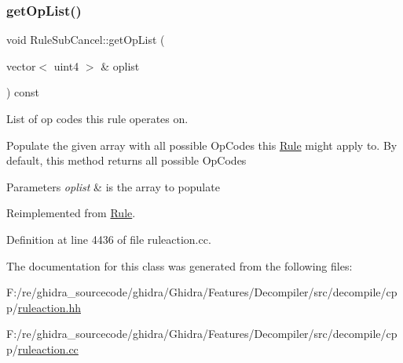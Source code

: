 \subsubsection{\texorpdfstring{getOpList()}{getOpList()}}
{\footnotesize\ttfamily void Rule\+Sub\+Cancel\+::get\+Op\+List (\begin{DoxyParamCaption}\item[{vector$<$ uint4 $>$ \&}]{oplist }\end{DoxyParamCaption}) const\hspace{0.3cm}{\ttfamily [virtual]}}



List of op codes this rule operates on. 

Populate the given array with all possible Op\+Codes this \mbox{\hyperlink{class_rule}{Rule}} might apply to. By default, this method returns all possible Op\+Codes 
\begin{DoxyParams}{Parameters}
{\em oplist} & is the array to populate \\
\hline
\end{DoxyParams}


Reimplemented from \mbox{\hyperlink{class_rule_a4023bfc7825de0ab866790551856d10e}{Rule}}.



Definition at line 4436 of file ruleaction.\+cc.



The documentation for this class was generated from the following files\+:\begin{DoxyCompactItemize}
\item 
F\+:/re/ghidra\+\_\+sourcecode/ghidra/\+Ghidra/\+Features/\+Decompiler/src/decompile/cpp/\mbox{\hyperlink{ruleaction_8hh}{ruleaction.\+hh}}\item 
F\+:/re/ghidra\+\_\+sourcecode/ghidra/\+Ghidra/\+Features/\+Decompiler/src/decompile/cpp/\mbox{\hyperlink{ruleaction_8cc}{ruleaction.\+cc}}\end{DoxyCompactItemize}
